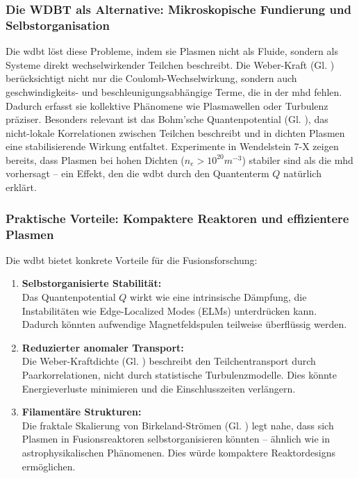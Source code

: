 \subsubsection{Die WDBT als Alternative: Mikroskopische Fundierung und Selbstorganisation}
Die \gls{wdbt} löst diese Probleme, indem sie Plasmen nicht als Fluide, sondern als Systeme direkt wechselwirkender Teilchen beschreibt. Die Weber-Kraft (Gl. ) berücksichtigt
nicht nur die Coulomb-Wechselwirkung, sondern auch geschwindigkeits- und beschleunigungsabhängige Terme, die in der \gls{mhd} fehlen. Dadurch erfasst sie kollektive Phänomene wie Plasmawellen oder
Turbulenz präziser. Besonders relevant ist das Bohm’sche Quantenpotential (Gl. ), das nicht-lokale Korrelationen zwischen Teilchen beschreibt und in dichten Plasmen eine
stabilisierende Wirkung entfaltet. Experimente in Wendelstein 7-X zeigen bereits, dass Plasmen bei hohen Dichten ($n_e > 10^{20}m^{-3}$) stabiler sind als die \gls{mhd} vorhersagt – ein Effekt,
den die \gls{wdbt} durch den Quantenterm $Q$ natürlich erklärt.

\subsubsection{Praktische Vorteile: Kompaktere Reaktoren und effizientere Plasmen}
Die \gls{wdbt} bietet konkrete Vorteile für die Fusionsforschung:

\begin{enumerate}
    \item \textbf{Selbstorganisierte Stabilität:}\\Das Quantenpotential $Q$ wirkt wie eine intrinsische Dämpfung, die Instabilitäten wie Edge-Localized Modes (ELMs) unterdrücken kann. Dadurch könnten aufwendige Magnetfeldspulen teilweise überflüssig werden.
    \item \textbf{Reduzierter anomaler Transport:}\\Die Weber-Kraftdichte (Gl. ) beschreibt den Teilchentransport durch Paarkorrelationen, nicht durch statistische Turbulenzmodelle. Dies könnte Energieverluste minimieren und die Einschlusszeiten verlängern.
    \item \textbf{Filamentäre Strukturen:}\\Die fraktale Skalierung von Birkeland-Strömen (Gl. ) legt nahe, dass sich Plasmen in Fusionsreaktoren selbstorganisieren könnten – ähnlich wie in astrophysikalischen Phänomenen. Dies würde kompaktere Reaktordesigns ermöglichen.
\end{enumerate}


